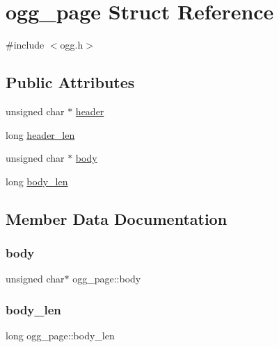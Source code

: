 \hypertarget{structogg__page}{}\section{ogg\+\_\+page Struct Reference}
\label{structogg__page}


{\ttfamily \#include $<$ogg.\+h$>$}

\subsection*{Public Attributes}
\begin{DoxyCompactItemize}
\item 
unsigned char $\ast$ \mbox{\hyperlink{structogg__page_a9f251dc1a96fbfd84ff2585fbbc03c16}{header}}
\item 
long \mbox{\hyperlink{structogg__page_aeaa6edc2ff9f2c5cc8f0ecf001936b7b}{header\+\_\+len}}
\item 
unsigned char $\ast$ \mbox{\hyperlink{structogg__page_af2fdee76f20ac267c6233f1d5f8afd30}{body}}
\item 
long \mbox{\hyperlink{structogg__page_ac6e649f0001899b512935448a903abac}{body\+\_\+len}}
\end{DoxyCompactItemize}


\subsection{Member Data Documentation}
\mbox{\label{structogg__page_af2fdee76f20ac267c6233f1d5f8afd30}} 
\subsubsection{\texorpdfstring{body}{body}}
{\footnotesize\ttfamily unsigned char$\ast$ ogg\+\_\+page\+::body}

\mbox{\label{structogg__page_ac6e649f0001899b512935448a903abac}} 
\subsubsection{\texorpdfstring{body\+\_\+len}{body\_len}}
{\footnotesize\ttfamily long ogg\+\_\+page\+::body\+\_\+len}

